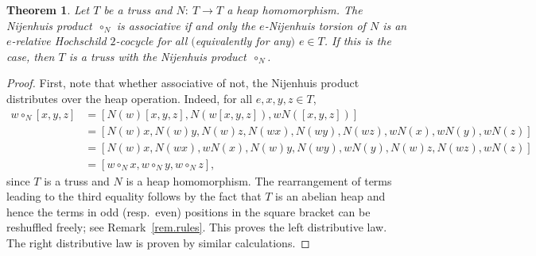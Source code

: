 \documentclass[pdftex]{sigma}
\numberwithin{equation}{section}
\newtheorem{Theorem}{Theorem}[section]
\begin{document}
\begin{Theorem} \label{2nd}
Let $T$ be a truss and $N\colon\ T\to T$ a heap homomorphism.
The Nijenhuis product~$\circ_{N}$ is associative if and only the $e$-Nijenhuis torsion of $N$ is an $e$-relative Hochschild $2$-cocycle for all $($equivalently for any$)$ $e\in T$. If this is the case, then $T$ is a truss with the Nijenhuis product~$\circ_{N}$.
\end{Theorem}
\begin{proof}
First, note that whether associative of not, the Nijenhuis product distributes over the heap operation. Indeed, for all $e,x,y,z\in T$,
\begin{align*}
w \circ_{N}[x,y,z]
&=\left[N(w)[x,y,z],N(w[x,y,z]),wN([x,y,z])\right] \\
&= \left[N(w)x,N(w)y ,N(w)z, N(wx),N(wy),N(wz), wN(x) ,wN(y) , wN(z)\right]\\
 &= \left[N(w)x,N(wx),wN(x), N(w)y,N(wy),wN(y), N(w)z,N(wz),wN(z)\right] \\
&=
[w \circ_{N}x,w \circ_{N}y,w \circ_{N}z],
\end{align*}
since $T$ is a truss and $N$ is a heap homomorphism. The rearrangement of terms leading to the third equality follows by the fact that $T$ is an abelian heap and hence the terms in odd (resp.\ even) positions in the square bracket can be reshuffled freely; see Remark~\ref{rem.rules}. This proves the left distributive law. The right distributive law is proven by similar calculations.


\end{proof}
\end{document}
